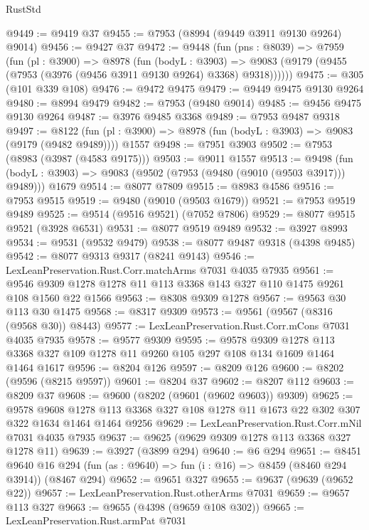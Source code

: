 \begin{lexlean}{RustStd}
\begin{coremodule}
@9449 := @9419 @37
@9455 := @7953 (@8994 (@9449 @3911 @9130 @9264) @9014)
@9456 := @9427 @37
@9472 := @9448
    (fun (pns : @8039) =>
    @7959
      (fun (pl : @3900) =>
      @8978
        (fun (bodyL : @3903) =>
        @9083 (@9179 (@9455 (@7953 (@3976 (@9456 @3911 @9130 @9264) @3368) @9318))))))
@9475 := @305 (@101 @339 @108)
@9476 := @9472 @9475
@9479 := @9449 @9475 @9130 @9264
@9480 := @8994 @9479
@9482 := @7953 (@9480 @9014)
@9485 := @9456 @9475 @9130 @9264
@9487 := @3976 @9485 @3368
@9489 := @7953 @9487 @9318
@9497 := @8122
    (fun (pl : @3900) => @8978 (fun (bodyL : @3903) => @9083 (@9179 (@9482 @9489))))
    @1557
@9498 := @7951 @3903
@9502 := @7953 (@8983 (@3987 (@4583 @9175)))
@9503 := @9011 @1557
@9513 := @9498
    (fun (bodyL : @3903) => @9083 (@9502 (@7953 (@9480 (@9010 (@9503 @3917))) @9489)))
    @1679
@9514 := @8077 @7809
@9515 := @8983 @4586
@9516 := @7953 @9515
@9519 := @9480 (@9010 (@9503 @1679))
@9521 := @7953 @9519 @9489
@9525 := @9514 (@9516 @9521) (@7052 @7806)
@9529 := @8077 @9515 @9521 (@3928 @6531)
@9531 := @8077 @9519 @9489
@9532 := @3927 @8993
@9534 := @9531 (@9532 @9479)
@9538 := @8077 @9487 @9318 (@4398 @9485)
@9542 := @8077 @9313 @9317 (@8241 @9143)
@9546 := LexLeanPreservation.Rust.Corr.matchArms @7031 @4035 @7935
@9561 := @9546 @9309 @1278 @1278 @11 @113 @3368 @143 @327 @110 @1475 @9261 @108 @1560 @22 @1566
@9563 := @8308 @9309 @1278
@9567 := @9563 @30 @113 @30 @1475
@9568 := @8317 @9309
@9573 := @9561 (@9567 (@8316 (@9568 @30)) @8443)
@9577 := LexLeanPreservation.Rust.Corr.mCons @7031 @4035 @7935
@9578 := @9577 @9309
@9595 := @9578
    @9309
    @1278
    @113
    @3368
    @327
    @109
    @1278
    @11
    @9260
    @105
    @297
    @108
    @134
    @1609
    @1464
    @1464
    @1617
@9596 := @8204 @126
@9597 := @8209 @126
@9600 := @8202 (@9596 (@8215 @9597))
@9601 := @8204 @37
@9602 := @8207 @112
@9603 := @8209 @37
@9608 := @9600 (@8202 (@9601 (@9602 @9603)) @9309)
@9625 := @9578
    @9608
    @1278
    @113
    @3368
    @327
    @108
    @1278
    @11
    @1673
    @22
    @302
    @307
    @322
    @1634
    @1464
    @1464
    @9256
@9629 := LexLeanPreservation.Rust.Corr.mNil @7031 @4035 @7935
@9637 := @9625 (@9629 @9309 @1278 @113 @3368 @327 @1278 @11)
@9639 := @3927 (@3899 @294)
@9640 := @6 @294
@9651 := @8451
    @9640
    @16
    @294
    (fun (as : @9640) => fun (i : @16) => @8459 (@8460 @294 @3914))
    (@8467 @294)
@9652 := @9651 @327
@9655 := @9637 (@9639 (@9652 @22))
@9657 := LexLeanPreservation.Rust.otherArms @7031
@9659 := @9657 @113 @327
@9663 := @9655 (@4398 (@9659 @108 @302))
@9665 := LexLeanPreservation.Rust.armPat @7031

\end{coremodule}
\end{lexlean}
